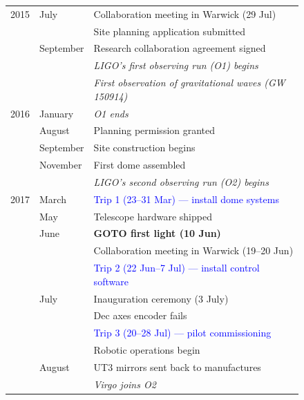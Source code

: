 \begin{colsection}
\begin{figure}[p]
    \begin{center}
        \begin{tabular}{cl|@{\tls}l} %
            2015 & July      & Collaboration meeting in Warwick (29 Jul) \\
                 &           & Site planning application submitted \\
                 & September & Research collaboration agreement signed \\
                 &           & \textit{LIGO's first observing run (O1) begins} \\
                 &           & \textit{First observation of gravitational waves (GW 150914)} \\
            \midrule
            2016 & January   & \textit{O1 ends} \\
                 & August    & Planning permission granted \\
                 & September & Site construction begins \\
                 & November  & First dome assembled \\
                 &           & \textit{LIGO's second observing run (O2) begins} \\
            \midrule
            2017 & March     & \textcolor{Blue}{Trip 1 (23--31 Mar) --- install dome systems} \\
                 & May       & Telescope hardware shipped \\
                 & June      & \textbf{GOTO first light (10 Jun)} \\
                 &           & Collaboration meeting in Warwick (19--20 Jun) \\
                 &           & \textcolor{Blue}{Trip 2 (22 Jun--7 Jul) --- install control software} \\
                 & July      & Inauguration ceremony (3 July) \\
                 &           & Dec axes encoder fails \\
                 &           & \textcolor{Blue}{Trip 3 (20--28 Jul) --- pilot commissioning} \\
                 &           & Robotic operations begin \\
                 & August    & UT3 mirrors sent back to manufactures \\
                 &           & \textit{Virgo joins O2} \\

\end{tabular}
\end{center}
\end{figure}
\end{colsection}
